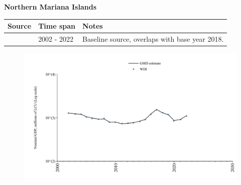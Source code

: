 \documentclass[12pt,a4paper,landscape]{article}
\begin{document}
\begin{adjustbox}{max totalsize={\paperwidth}{\paperheight},center}
\begin{minipage}[t][\textheight][t]{\textwidth}
\vspace*{0.5cm}
{}
\begin{center}
{\Large\bfseries Northern Mariana Islands}
\end{center}
\vspace{0.5cm}
\begin{table}[H]
\centering
\small
\begin{tabular}{|l|l|l|}
\hline
\textbf{Source} & \textbf{Time span} & \textbf{Notes} \\
\hline
\rowcolor{white}\cite{WDI}& 2002 - 2022 &Baseline source, overlaps with base year 2018.\\
\hline
\end{tabular}
\end{table}
\begin{figure}[H]
\centering
\includegraphics[width=\textwidth,height=0.6\textheight,keepaspectratio]{graphs/MNP_nGDP.pdf}
\end{figure}
\end{minipage}
\end{adjustbox}
\end{document}
